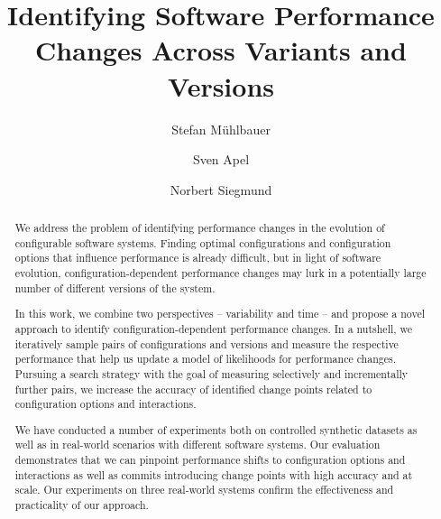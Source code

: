 \documentclass[sigconf]{acmart}
\begin{document}
	\title{Identifying Software Performance Changes Across Variants and Versions}


	\author{Stefan Mühlbauer}

	\author{Sven Apel}

	\author{Norbert Siegmund}

	\begin{abstract}
		We address the problem of identifying performance changes in the evolution of configurable software systems. Finding optimal configurations and configuration options that influence performance is already difficult, but in light of software evolution, configuration-dependent performance changes may lurk in a potentially large number of different versions of the system.
		
		In this work, we combine two perspectives -- variability and time -- and propose a novel approach to identify configuration-dependent performance changes. In a nutshell, we iteratively sample pairs of configurations and versions and measure the respective performance that help us update a model of likelihoods for performance changes. Pursuing a search strategy with the goal of measuring selectively and incrementally further pairs, we increase the accuracy of identified change points related to configuration options and interactions.
		
		We have conducted a number of experiments both on controlled synthetic datasets as well as in real-world scenarios with different software systems. Our evaluation demonstrates that we can pinpoint performance shifts to configuration options and interactions as well as commits introducing change points with high accuracy and at scale. Our experiments on three real-world systems confirm the effectiveness and practicality of our approach.
		
	\end{abstract}
\end{document}
